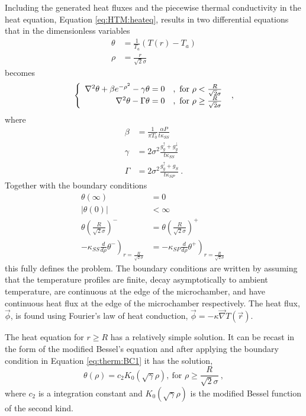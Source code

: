 Including the generated heat fluxes and the piecewise thermal conductivity in the heat equation, Equation \ref{eq:HTM:heateq}, results in two differential equations that in the dimensionless variables
\begin{align*}
	\theta&= \frac{1}{T_a} (T(r)-T_a) \\
	\rho&=\frac{r}{\sqrt{2} \sigma}
\end{align*}
becomes
\begin{equation}
	\left\{
	\begin{array}{r l}
	\nabla^2 \theta + \beta e^{-\rho^2} - \gamma \theta =0 & , \ \textrm{for } \rho < \frac{R}{\sqrt{2} \sigma} \\
	\nabla^2 \theta - \Gamma \theta =0 & , \ \textrm{for } \rho \geq \frac{R}{\sqrt{2} \sigma}
	\end{array}
	\right. \ , \label{eq:HTM:DE}
\end{equation}
where
\begin{align*}
	\beta &=\frac{1}{\pi T_0} \frac{\alpha P}{t \kappa_{SS}}\\
	\gamma&=2 \sigma^2 \frac{g_g^{\uparrow}+g_g^{\downarrow}}{t \kappa_{SS}} \\
	\Gamma&=2 \sigma^2 \frac{g_g^{\uparrow}+g_S             }{t \kappa_{SP}} \ .
\end{align*}
Together with the boundary conditions
\begin{align}
	\theta(\infty) &= 0 \label{eq:therm:BC1} \\
	|\theta(0)| &< \infty \label{eq:therm:BC2} \\
	\theta\left(\frac{R}{\sqrt{2} \sigma}\right)^- &= \theta\left(\frac{R}{\sqrt{2} \sigma}\right)^+ 
		\label{eq:therm:BC3} \\
	-\kappa_{SS} \left. \frac{d}{d\rho} \theta^- \right)_{r=\frac{R}{\sqrt{2} \sigma}}&=
	-\kappa_{SP} \left. \frac{d}{d\rho} \theta^+ \right)_{r=\frac{R}{\sqrt{2} \sigma}} \  \label{eq:therm:BC4}
\end{align}
this fully defines the problem.
The boundary conditions are written by assuming that the temperature profiles are finite, decay asymptotically to ambient temperature, are continuous at the edge of the microchamber, and have continuous heat flux at the edge of the microchamber respectively.
The heat flux, $\vec{\phi}$, is found using Fourier's law of heat conduction, $\vec{\phi}=-\kappa \vec{\nabla} T(\vec{r})$.

The heat equation for $r \geq R$ has a relatively simple solution.
It can be recast in the form of the modified Bessel's equation and after applying the boundary condition in Equation \ref{eq:therm:BC1} it has the solution,
\begin{equation}
	\theta(\rho)=c_2 K_0 (\sqrt{\gamma} \rho) , \ \textrm{for } \rho \geq \frac{R}{\sqrt{2} \sigma} \ ,
\end{equation}
where $c_2$ is a integration constant and $K_0 (\sqrt{\gamma} \rho)$ is the modified Bessel function of the second kind.

